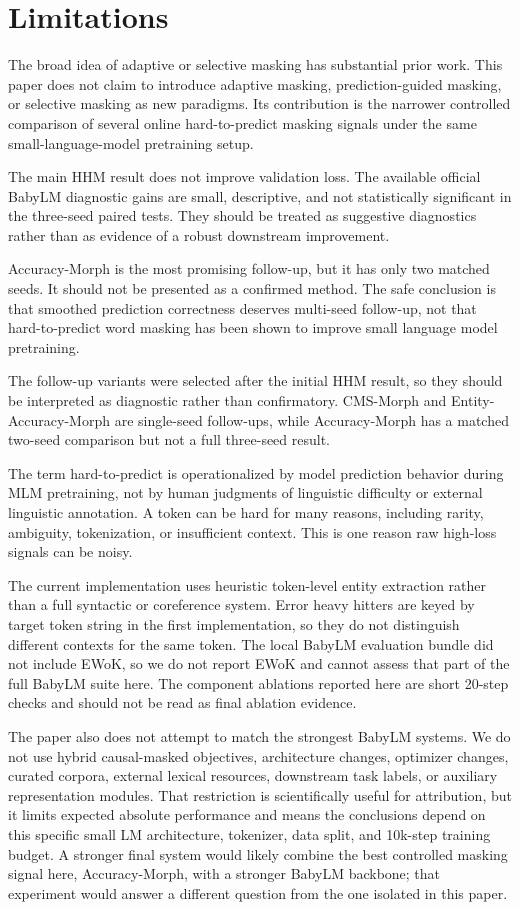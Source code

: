 \section{Limitations}

The broad idea of adaptive or selective masking has substantial prior work. This paper does not claim to introduce adaptive masking, prediction-guided masking, or selective masking as new paradigms. Its contribution is the narrower controlled comparison of several online hard-to-predict masking signals under the same small-language-model pretraining setup.

The main HHM result does not improve validation loss. The available official BabyLM diagnostic gains are small, descriptive, and not statistically significant in the three-seed paired tests. They should be treated as suggestive diagnostics rather than as evidence of a robust downstream improvement.

Accuracy-Morph is the most promising follow-up, but it has only two matched seeds. It should not be presented as a confirmed method. The safe conclusion is that smoothed prediction correctness deserves multi-seed follow-up, not that hard-to-predict word masking has been shown to improve small language model pretraining.

The follow-up variants were selected after the initial HHM result, so they should be interpreted as diagnostic rather than confirmatory. CMS-Morph and Entity-Accuracy-Morph are single-seed follow-ups, while Accuracy-Morph has a matched two-seed comparison but not a full three-seed result.

The term hard-to-predict is operationalized by model prediction behavior during MLM pretraining, not by human judgments of linguistic difficulty or external linguistic annotation. A token can be hard for many reasons, including rarity, ambiguity, tokenization, or insufficient context. This is one reason raw high-loss signals can be noisy.

The current implementation uses heuristic token-level entity extraction rather than a full syntactic or coreference system. Error heavy hitters are keyed by target token string in the first implementation, so they do not distinguish different contexts for the same token. The local BabyLM evaluation bundle did not include EWoK, so we do not report EWoK and cannot assess that part of the full BabyLM suite here. The component ablations reported here are short 20-step checks and should not be read as final ablation evidence.

The paper also does not attempt to match the strongest BabyLM systems. We do not use hybrid causal-masked objectives, architecture changes, optimizer changes, curated corpora, external lexical resources, downstream task labels, or auxiliary representation modules. That restriction is scientifically useful for attribution, but it limits expected absolute performance and means the conclusions depend on this specific small LM architecture, tokenizer, data split, and 10k-step training budget. A stronger final system would likely combine the best controlled masking signal here, Accuracy-Morph, with a stronger BabyLM backbone; that experiment would answer a different question from the one isolated in this paper.
